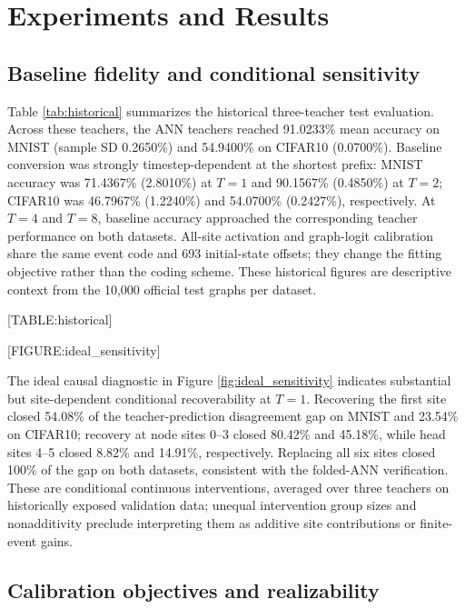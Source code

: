 \documentclass{article}
\begin{document}
\section{Experiments and Results}

\label{sec:experiments_and_results}

\subsection{Baseline fidelity and conditional sensitivity}

\label{sec:baseline_fidelity_and_conditional_sensit}

Table \ref{tab:historical} summarizes the historical three-teacher test evaluation. Across these teachers, the ANN teachers reached 91.0233\% mean accuracy on MNIST (sample SD 0.2650\%) and 54.9400\% on CIFAR10 (0.0700\%). Baseline conversion was strongly timestep-dependent at the shortest prefix: MNIST accuracy was 71.4367\% (2.8010\%) at $T=1$ and 90.1567\% (0.4850\%) at $T=2$; CIFAR10 was 46.7967\% (1.2240\%) and 54.0700\% (0.2427\%), respectively. At $T=4$ and $T=8$, baseline accuracy approached the corresponding teacher performance on both datasets. All-site activation and graph-logit calibration share the same event code and 693 initial-state offsets; they change the fitting objective rather than the coding scheme. These historical figures are descriptive context from the 10,000 official test graphs per dataset.

[TABLE:historical]

[FIGURE:ideal\_sensitivity]

The ideal causal diagnostic in Figure \ref{fig:ideal_sensitivity} indicates substantial but site-dependent conditional recoverability at $T=1$. Recovering the first site closed 54.08\% of the teacher-prediction disagreement gap on MNIST and 23.54\% on CIFAR10; recovery at node sites 0--3 closed 80.42\% and 45.18\%, while head sites 4--5 closed 8.82\% and 14.91\%, respectively. Replacing all six sites closed 100\% of the gap on both datasets, consistent with the folded-ANN verification. These are conditional continuous interventions, averaged over three teachers on historically exposed validation data; unequal intervention group sizes and nonadditivity preclude interpreting them as additive site contributions or finite-event gains.

\subsection{Calibration objectives and realizability}
\end{document}
